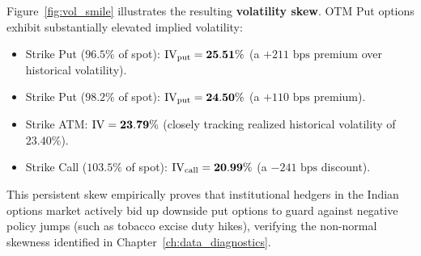 Figure~\ref{fig:vol_smile} illustrates the resulting \textbf{volatility skew}. OTM Put options exhibit substantially elevated implied volatility:
\begin{itemize}
    \item Strike  Put ($96.5\%$ of spot): $\operatorname{IV}_{\text{put}} = \mathbf{25.51\%}$ (a $+211\text{ bps}$ premium over historical volatility).
    \item Strike  Put ($98.2\%$ of spot): $\operatorname{IV}_{\text{put}} = \mathbf{24.50\%}$ (a $+110\text{ bps}$ premium).
    \item Strike  ATM: $\operatorname{IV} = \mathbf{23.79\%}$ (closely tracking realized historical volatility of $23.40\%$).
    \item Strike  Call ($103.5\%$ of spot): $\operatorname{IV}_{\text{call}} = \mathbf{20.99\%}$ (a $-241\text{ bps}$ discount).
\end{itemize}
This persistent skew empirically proves that institutional hedgers in the Indian options market actively bid up downside put options to guard against negative policy jumps (such as tobacco excise duty hikes), verifying the non-normal skewness identified in Chapter~\ref{ch:data_diagnostics}.
